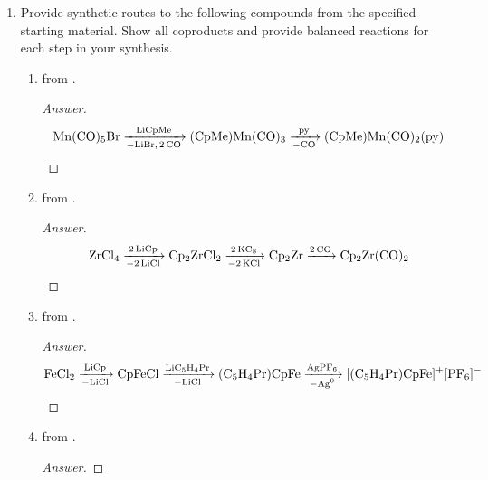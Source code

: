 \documentclass[../psets.tex]{subfiles}
\begin{document}
\begin{enumerate}
\begin{proof}[Answer]
        There are a number of differences between  and . To begin with,  is lower and earlier in the periodic table than . However, molybdenum also has a relatively higher oxidation state and more ligands to which it can backbond. As such, it backbonds less to each ligand overall.\par
        Lastly, we must discuss  and . Both have identical $d$ counts, but  comes later in the periodic table, is higher in the periodic table, has a higher oxidation state, and has more ligands than . As such, the iron center most certainly backbonds less strongly than the rhenium center.
    \end{proof}
    \item Provide synthetic routes to the following compounds from the specified starting material. Show all coproducts and provide balanced reactions for each step in your synthesis.
    \begin{enumerate}
        \item {} from .
        \begin{proof}[Answer]
            \begin{equation*}
                \ce{Mn(CO)5Br ->[LiCpMe][-LiBr, 2CO] (CpMe)Mn(CO)3 ->[py][-CO] (CpMe)Mn(CO)2(py)}
            \end{equation*}
        \end{proof}
        \item {} from .
        \begin{proof}[Answer]
            \begin{equation*}
                \ce{ZrCl4 ->[2LiCp][-2LiCl] Cp2ZrCl2 ->[2KC8][-2KCl] Cp2Zr ->[2CO] Cp2Zr(CO)2}
            \end{equation*}
        \end{proof}
        \item \ce{[(C5H4Pr)CpFe]+[PF6]-} from .
        \begin{proof}[Answer]
            \begin{equation*}
                \ce{FeCl2 ->[LiCp][-LiCl] CpFeCl ->[LiC5H4Pr][-LiCl] (C5H4Pr)CpFe ->[AgPF6][-Ag^0] [(C5H4Pr)CpFe]+[PF6]-}
            \end{equation*}
        \end{proof}
        \item {} from .
        \begin{proof}[Answer]

\end{proof}
\end{enumerate}
\end{enumerate}
\end{document}
